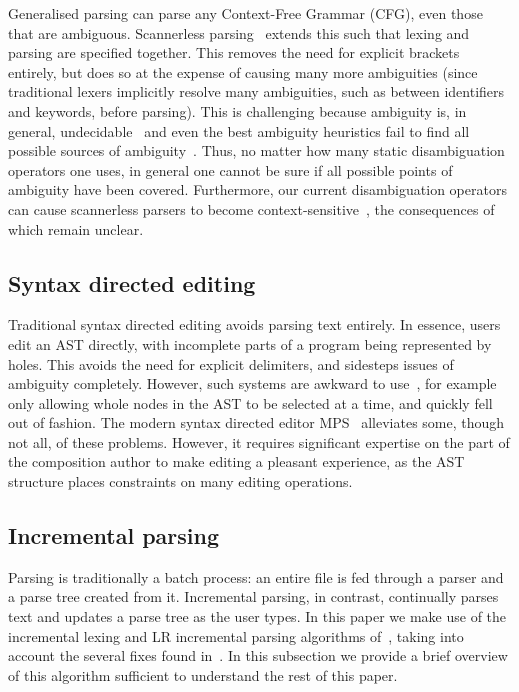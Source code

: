 \documentclass[sigplan,screen]{acmart}\settopmatter{printfolios=true,printccs=false,printacmref=false}
\begin{document}
Generalised parsing can parse any Context-Free Grammar (CFG), even those that
are ambiguous. Scannerless parsing~\cite{visser97scannerless} extends this such
that lexing and parsing are specified together. This removes the need for
explicit brackets entirely, but does so at the expense of causing many more
ambiguities (since traditional lexers implicitly resolve many ambiguities, such
as between identifiers and keywords, before parsing).
This is challenging because ambiguity is, in general,
undecidable~\cite{cantor62ambiguity} and even the best ambiguity heuristics fail
to find all possible sources of ambiguity~\cite{vasudevan13detecting}. Thus,
no matter how many static disambiguation operators one uses, in general one
cannot be sure if all possible points of ambiguity have been covered.
Furthermore, our current disambiguation operators can cause scannerless
parsers to become context-sensitive~\cite{eijck__lets_accept_rejects}, the
consequences of which remain unclear.


\subsection{Syntax directed editing}

Traditional syntax directed editing avoids parsing text entirely. In essence,
users edit an AST directly, with incomplete parts of a program being
represented by holes. This avoids the need for explicit delimiters, and
sidesteps issues of ambiguity completely. However, such systems are awkward to
use~\cite[p.~2]{khwaja93syntax}, for example only allowing whole nodes in the AST to be selected at a time,
and quickly fell out of fashion. The modern syntax directed editor
MPS~\cite{pech13mps} alleviates some, though not all, of these problems.
However, it requires significant expertise on the part of the composition
author to make editing a pleasant experience, as the AST structure places
constraints on many editing operations.


\subsection{Incremental parsing}

Parsing is traditionally a batch process: an entire file is fed through a parser
and a parse tree created from it. Incremental parsing, in contrast,
continually parses text and updates a parse tree as the user types.
In this paper we make use of the incremental lexing and
LR incremental parsing algorithms of~\citet{wagner98practicalalgorithms},
taking into account the several fixes found in~\cite{diekmann18editing}.
In this subsection we provide a brief overview of this algorithm sufficient
to understand the rest of this paper.
\end{document}
